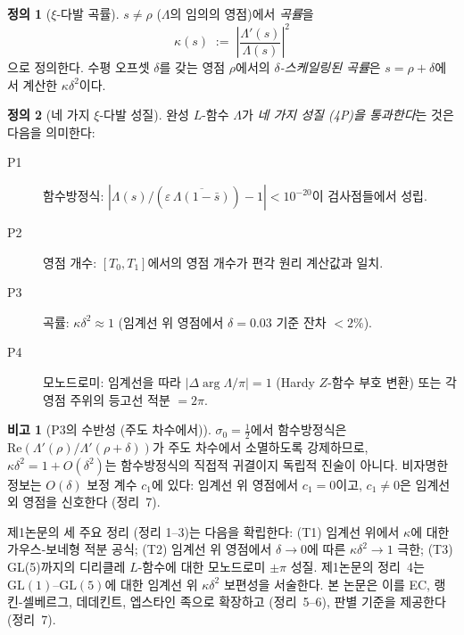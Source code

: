 \documentclass[11pt, a4paper]{article}
\theoremstyle{plain}
\theoremstyle{definition}
\newtheorem{definition}{정의}[section]
\newtheorem{remark}{비고}[section]
\begin{document}
\begin{definition}[$\xi$-다발 곡률]
  $s\neq\rho$ ($\Lambda$의 임의의 영점)에서 \emph{곡률}을
  \[
    \kappa(s) \;:=\; \left|\frac{\Lambda'(s)}{\Lambda(s)}\right|^{2}
  \]
  으로 정의한다. 수평 오프셋 $\delta$를 갖는 영점 $\rho$에서의
  \emph{$\delta$-스케일링된 곡률}은 $s = \rho+\delta$에서
  계산한 $\kappa\delta^{2}$이다.
\end{definition}

\begin{definition}[네 가지 $\xi$-다발 성질]
  완성 $L$-함수 $\Lambda$가 \emph{네 가지 성질 (4P)을 통과한다}는 것은
  다음을 의미한다:
  \begin{description}
    \item[P1] 함수방정식:
      $|\Lambda(s)/(\varepsilon\,\overline{\Lambda(1-\bar{s})})-1|<10^{-20}$이
      검사점들에서 성립.
    \item[P2] 영점 개수: $[T_{0}, T_{1}]$에서의 영점 개수가
      편각 원리 계산값과 일치.
    \item[P3] 곡률: $\kappa\delta^{2}\approx 1$
      (임계선 위 영점에서 $\delta=0.03$ 기준 잔차 $<2\%$).
    \item[P4] 모노드로미: 임계선을 따라
      $|{}\Delta\!\arg\Lambda\!/\pi|=1$ (Hardy $Z$-함수 부호 변환)
      또는 각 영점 주위의 등고선 적분 $=2\pi$.
  \end{description}
\end{definition}

\begin{remark}[P3의 수반성 (주도 차수에서)]
\label{rem:tautology}
  $\sigma_{0}=\tfrac{1}{2}$에서 함수방정식은
  $\mathrm{Re}(\Lambda'(\rho)/\Lambda'(\rho+\delta))$가
  주도 차수에서 소멸하도록 강제하므로,
  $\kappa\delta^{2}=1+O(\delta^{2})$는
  함수방정식의 직접적 귀결이지 독립적 진술이 아니다.
  비자명한 정보는 $O(\delta)$ 보정 계수 $c_{1}$에 있다:
  임계선 위 영점에서 $c_{1}=0$이고,
  $c_{1}\neq 0$은 임계선 외 영점을 신호한다 (정리~7).
\end{remark}

제1논문의 세 주요 정리 (정리 1--3)는 다음을 확립한다:
(T1) 임계선 위에서 $\kappa$에 대한 가우스-보네형 적분 공식;
(T2) 임계선 위 영점에서 $\delta\to 0$에 따른
$\kappa\delta^{2}\to 1$ 극한;
(T3) GL(5)까지의 디리클레 $L$-함수에 대한 모노드로미 $\pm\pi$ 성질.
제1논문의 정리~4는 $\mathrm{GL}(1)$--$\mathrm{GL}(5)$에 대한
임계선 위 $\kappa\delta^{2}$ 보편성을 서술한다.
본 논문은 이를 EC, 랭킨-셀베르그, 데데킨트, 엡스타인 족으로 확장하고
(정리~5--6), 판별 기준을 제공한다 (정리~7).
\end{document}
